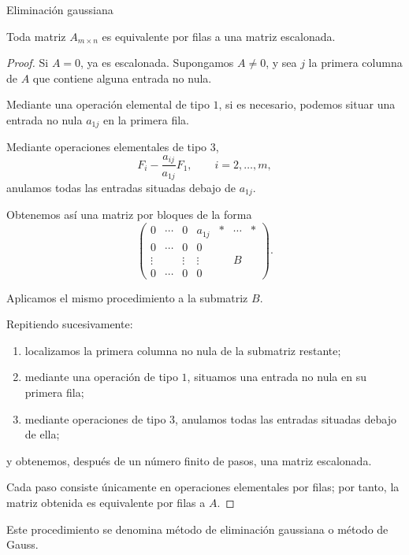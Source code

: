 \begin{frame}[t,allowframebreaks]{Eliminación gaussiana}

\begin{theorem}
Toda matriz $A_{m\times n}$ es equivalente por filas a una matriz escalonada.
\end{theorem}

\begin{proof}
Si \(A=0\), ya es escalonada. Supongamos \(A\neq0\), y sea \(j\)
la primera columna de \(A\) que contiene alguna entrada no nula.

\medskip

Mediante una operación elemental de tipo \(1\), si es necesario,
podemos situar una entrada no nula \(a_{1j}\) en la primera fila.

\medskip

Mediante operaciones elementales de tipo \(3\),
\[
F_i-\frac{a_{ij}}{a_{1j}}F_1,
\qquad i=2,\ldots,m,
\]
anulamos todas las entradas situadas debajo de \(a_{1j}\).

Obtenemos así una matriz por bloques de la forma
\[
\left(
\begin{array}{cccc|ccc}
0&\cdots&0&a_{1j}& * & \cdots & *\\
\hline
0&\cdots&0&0&\\
\vdots&&\vdots&\vdots&&B&\\
0&\cdots&0&0&
\end{array}
\right).
\]

Aplicamos el mismo procedimiento a la submatriz \(B\).

\medskip

Repitiendo sucesivamente:
\begin{enumerate}
    \item localizamos la primera columna no nula de la submatriz restante;
    \item mediante una operación de tipo \(1\), situamos una entrada
    no nula en su primera fila;
    \item mediante operaciones de tipo \(3\), anulamos todas las
    entradas situadas debajo de ella;
\end{enumerate}
y obtenemos, después de un número finito de pasos, una matriz escalonada.

\medskip

Cada paso consiste únicamente en operaciones elementales por filas;
por tanto, la matriz obtenida es equivalente por filas a \(A\).
\end{proof}

Este procedimiento se denomina \alert{método de eliminación gaussiana} o \alert{método de Gauss}.
\end{frame}

